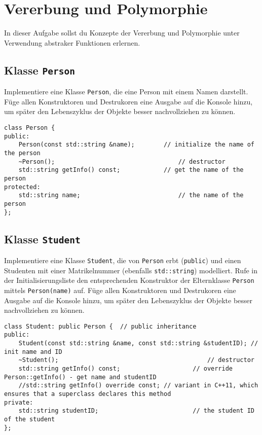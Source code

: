 \section{Vererbung und Polymorphie}\label{sec:inheritance}
In dieser Aufgabe sollst du Konzepte der Vererbung und Polymorphie unter Verwendung abstraker Funktionen erlernen.

\subsection{Klasse \texttt{Person}}
Implementiere eine Klasse \texttt{Person}, die eine Person mit einem Namen darstellt.
Füge allen Konstruktoren und Destrukoren eine Ausgabe auf die Konsole hinzu, um später den Lebenszyklus der Objekte besser nachvollziehen zu können.

\begin{lstlisting}
class Person {
public:
	Person(const std::string &name);		// initialize the name of the person
	~Person();									// destructor
	std::string getInfo() const;			// get the name of the person
protected:
	std::string name;							// the name of the person
};
\end{lstlisting}


\subsection{Klasse \texttt{Student}}
Implementiere eine Klasse \texttt{Student}, die von \texttt{Person} erbt (\texttt{public}) und einen Studenten mit einer Matrikelnummer (ebenfalls \texttt{std::string}) modelliert.
Rufe in der Initialisierungsliste den entsprechenden Konstruktor der Elternklasse \texttt{Person} mittels \texttt{Person(name)} auf.
Füge allen Konstruktoren und Destrukoren eine Ausgabe auf die Konsole hinzu, um später den Lebenszyklus der Objekte besser nachvollziehen zu können.

\begin{lstlisting}
class Student: public Person {	// public inheritance
public:
	Student(const std::string &name, const std::string &studentID); // init name and ID
	~Student();											// destructor
	std::string getInfo() const;					// override Person::getInfo() - get name and studentID
	//std::string getInfo() override const;	// variant in C++11, which ensures that a superclass declares this method
private:
	std::string studentID;							// the student ID of the student
};
\end{lstlisting}

